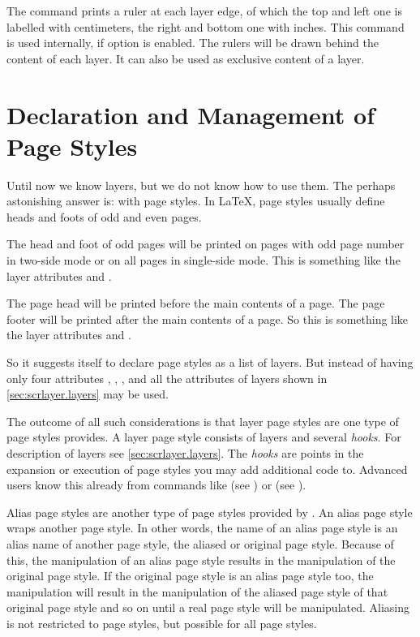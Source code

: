 \begin{Declaration}
\end{Declaration}
The command  prints a ruler at each layer edge, of
which the top and left one is labelled with centimeters, the right and bottom
one with inches.  This command is used internally, if option
 is enabled. The rulers
will be drawn behind the content of each layer.  It can also be used as
exclusive content of a layer.%
\EndIndexGroup


\section{Declaration and Management of Page Styles}

Until now we know layers, but we do not know how to use them. The
perhaps astonishing answer is: with page styles. In \LaTeX{}, page
styles usually define heads and foots of odd and even pages.

The head and foot of odd pages will be printed on pages with odd
page number in two-side mode or on all pages in single-side mode. This is
something like the layer attributes  and .

The page head will be printed before the main contents of a page. The page
footer will be printed after the main contents of a page. So this is something
like the layer attributes  and .

So it suggests itself to declare page styles as a list of layers. But instead of
having only four attributes , ,
, and  all the attributes of layers
shown in \autoref{sec:scrlayer.layers} may be used.

The outcome of all such considerations is that layer page styles are one type
of page styles  provides. A layer page style consists of
layers and several \emph{hooks}. For description of layers see
\autoref{sec:scrlayer.layers}.  The \emph{hooks} are points in the expansion
or execution of page styles you may add additional code to. Advanced users
know this already from commands like  (see
\cite{latex:usrguide}) or  (see
).

Alias page styles are another type of page styles provided by
. An alias page style wraps another page style. In other
words, the name of an alias page style is an alias name of another page style,
the aliased or original page style. Because of this, the manipulation of an
alias page style results in the manipulation of the original page style. If
the original page style is an alias page style too, the manipulation will
result in the manipulation of the aliased page style of that original page
style and so on until a real page style will be manipulated. Aliasing is not
restricted to  page styles, but possible for all page
styles.

